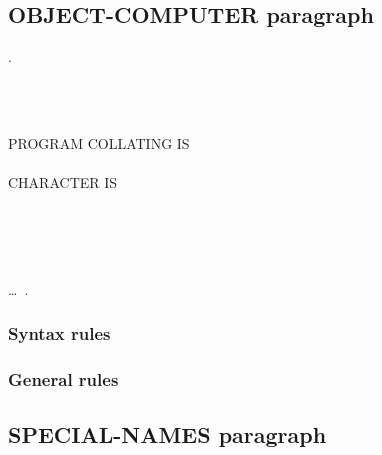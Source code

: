 \subsection{OBJECT-COMPUTER paragraph}
\begin{syntax}
  .

  \begin{0-1}
    \begin{0-1}
      \begin{1=}
        \computername
      \end{1=}\gnucobol{\ldots}
    \end{0-1}\\\quad
    \begin{0-1}
       \\
      PROGRAM COLLATING  IS  \\
       \\
      CHARACTER  IS
      \begin{1=}
         \\
         \\
         \\
      \end{1=}
    \end{0-1}\ldots\ {}.
  \end{0-1}
\end{syntax}

\subsubsection{Syntax rules}

\subsubsection{General rules}

\subsection{SPECIAL-NAMES paragraph}

